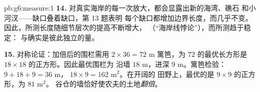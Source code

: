 \begin{solution}{pb:g6:measure:1}
\textbf{14.} 对真实海岸的每一次放大，都会显露出新的海湾、礁石
和小河汊——缺口叠着缺口，第 13 题表明
每个缺口都增加边界长度，而几乎不变。
因此，所测长度随细节层次的提高不断增大，
（“海岸线悖论”），而所测趋于稳定：
与确实是彼此独立的量。

\textbf{15.} 对称论证：加倍后的围栏需用
$2 \times 36 = 72$ m 篱笆，为
$72$ 的最优长方形是 $18 \times 18$ 的正方形。因此最优围栏为
沿墙 $18$ m，进深 $9$ m。篱笆检验：
$9 + 18 + 9 = 36$ m， $18 \times 9 = 162$ m$^2$。在开阔的
田野上，最优的是 $9 \times 9$ 的正方形，为 $81$ m$^2$。
谷仓的墙恰好使农夫的土地\emph{翻倍}。
\end{solution}

